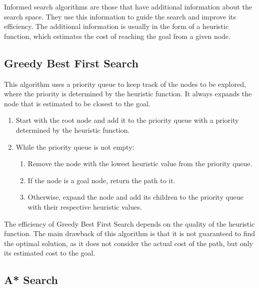 Informed search algorithms are those that have additional information about the search space. They use this information to guide the search and improve its efficiency. The additional information is usually in the form of a heuristic function, which estimates the cost of reaching the goal from a given node.

\subsection{Greedy Best First Search}

This algorithm uses a priority queue to keep track of the nodes to be explored, where the priority is determined by the heuristic function. It always expands the node that is estimated to be closest to the goal.
\begin{enumerate}
    \item Start with the root node and add it to the priority queue with a priority determined by the heuristic function.
    \item While the priority queue is not empty:
    \begin{enumerate}
        \item Remove the node with the lowest heuristic value from the priority queue.
        \item If the node is a goal node, return the path to it.
        \item Otherwise, expand the node and add its children to the priority queue with their respective heuristic values.
    \end{enumerate}
\end{enumerate}

The efficiency of Greedy Best First Search depends on the quality of the heuristic function. The main drawback of this algorithm is that it is not guaranteed to find the optimal solution, as it does not consider the actual cost of the path, but only its estimated cost to the goal.

\subsection{A* Search}

